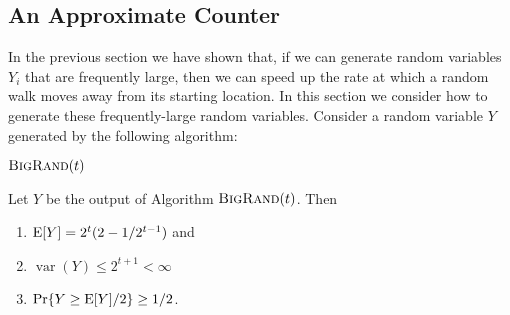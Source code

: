 \documentclass[acmtoalg]{acmtrans2m}
\newcommand{\bigrand}{\textsc{BigRand}}
\DeclareMathOperator{\var}{var}
\begin{document}
\subsection{An Approximate Counter}

In the previous section we have shown that, if we can generate random
variables $Y_i$ that are frequently large, then we can speed up the
rate at which a random walk moves away from its starting location.  In
this section we consider how to generate these frequently-large random
variables.  Consider a random variable $Y$ generated by the following
algorithm:

\noindent
\begin{minipage}{\textwidth}
$\bigrand(t)$
\begin{algorithmic}[1]
  \ELSE
  \ENDIF
\ENDWHILE
{}
\end{algorithmic}
\end{minipage}

\begin{lem}
Let $Y$ be the output of Algorithm $\bigrand(t)$.  Then 
\begin{enumerate}
\item $\mathrm{E}[Y]=2^t(2-1/2^{t-1})$ and
\item $\var(Y) \le 2^{t+1} < \infty$
\item $\Pr\{Y \ge \mathrm{E}[Y] / 2\} \ge 1/2$.
\end{enumerate}
\end{lem}
\end{document}

